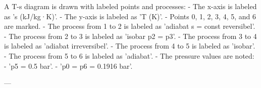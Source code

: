 A T-s diagram is drawn with labeled points and processes:  
- The x-axis is labeled as 's (kJ/kg·K)'.  
- The y-axis is labeled as 'T (K)'.  
- Points 0, 1, 2, 3, 4, 5, and 6 are marked.  
- The process from 1 to 2 is labeled as 'adiabat s = const reversibel'.  
- The process from 2 to 3 is labeled as 'isobar p2 = p3'.  
- The process from 3 to 4 is labeled as 'adiabat irreversibel'.  
- The process from 4 to 5 is labeled as 'isobar'.  
- The process from 5 to 6 is labeled as 'adiabat'.  
- The pressure values are noted:  
  - 'p5 = 0.5 bar'.  
  - 'p0 = p6 = 0.1916 bar'.  

---
